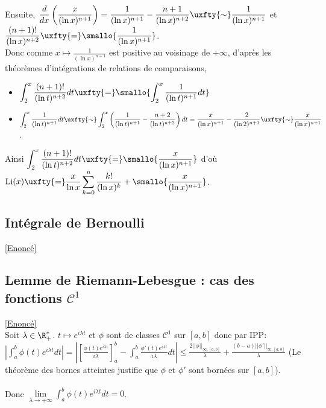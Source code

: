 \documentclass{book}
\begin{document}
	Ensuite, $\displaystyle\frac{d}{dx}\left(\frac{x}{(\ln x)^{n+1}}\right)=\frac{1}{(\ln x)^{n+1}}-\frac{n+1}{(\ln x)^{n+2}}\uxfty{\sim}\frac{1}{(\ln x)^{n+1}}$ et $\displaystyle\frac{(n+1)!}{(\ln x)^{n+2}}\uxfty{=}\smallo{\frac{1}{(\ln x)^{n+1}}}$.\\
	Donc comme $x\mapsto\displaystyle\frac{1}{(\ln x)^{n+1}}$ est positive au voisinage de $+\infty$, d'après les théorèmes d'intégrations de relations de comparaisons,
	\begin{itemize}
		\item $\displaystyle\int_2^x\frac{(n+1)!}{(\ln t)^{n+2}}dt\uxfty{=}\smallo{\int_2^x\frac{1}{(\ln t)^{n+1}}dt}$
		\item $\displaystyle\int_2^x\frac{1}{(\ln t)^{n+1}}dt\uxfty{\sim}\int_2^x\left(\frac{1}{(\ln t)^{n+1}}-\frac{n+2}{(\ln t)^{n+2}}\right)dt=\frac{x}{(\ln x)^{n+1}}-\frac{2}{(\ln 2)^{n+1}}\uxfty{\sim}\frac{x}{(\ln x)^{n+1}}$.
	\end{itemize}
	Ainsi $\displaystyle\int_2^x\frac{(n+1)!}{(\ln t)^{n+2}}dt\uxfty{=}\smallo{\frac{x}{(\ln x)^{n+1}}}$ d'où $\operatorname{Li}(x)\uxfty{=}\displaystyle\frac{x}{\ln x}\sum\limits_{k=0}^n\frac{k!}{(\ln x)^k}+\smallo{\displaystyle\frac{x}{(\ln x)^{n+1}}}$.
	
	\subsection{Intégrale de Bernoulli}\label{sec:integrale-de-bernoulli}
	\textcolor{blue}{\hyperref[intégralebernoulli]{[Enoncé]}}\\
	
	\subsection{Lemme de Riemann-Lebesgue : cas des fonctions $\mathcal{C}^1$ }\label{sec:lemme-de-riemann-lebesgue--cas-des-fonctions-mathcalc1-etoile1}
		\textcolor{blue}{\hyperref[riemannlebesgue]{[Enoncé]}}\\
	Soit $\lambda\in \R^*_+$. $t\mapsto e^{i\lambda t}$ et $\phi$ sont de classes $\mathcal{C}^1$ sur $[a,b]$ donc par IPP:\\
	$\left|\displaystyle\int_a^b\phi(t)e^{i\lambda t}dt\right|=\left|\left[\displaystyle\frac{\phi(t)e^{i\lambda t}}{i\lambda}\right]_a^b-\displaystyle\int_a^b\frac{\phi'(t)e^{i\lambda t}}{i\lambda}dt\right|\leq \displaystyle\frac{2||\phi||_{\infty,[a,b]}}{\lambda}+\frac{(b-a)||\phi'||_{\infty,[a,b]}}{\lambda}$ (Le théorème des bornes atteintes justifie que $\phi$ et $\phi'$ sont bornées sur $[a,b]$).\\\\
	Donc $\lim\limits_{\lambda\to +\infty}\displaystyle\int_a^b\phi(t)e^{i\lambda t}dt=0$.
	
\end{document}
